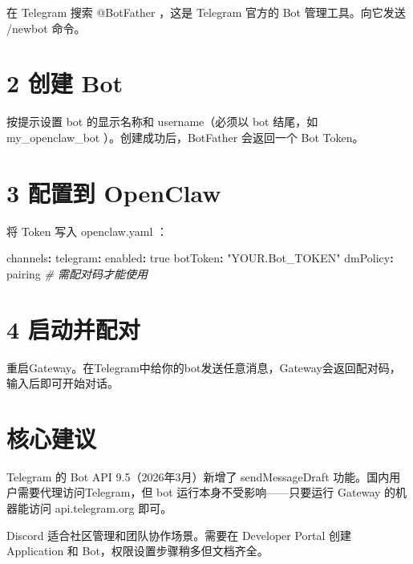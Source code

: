 \documentclass[
  10
]{article}
\newenvironment{Shaded}{}{}
\newcommand{\AttributeTok}[1]{\textcolor[rgb]{0.49,0.56,0.16}{#1}}
\newcommand{\CharTok}[1]{\textcolor[rgb]{0.25,0.44,0.63}{#1}}
\newcommand{\CommentTok}[1]{\textcolor[rgb]{0.38,0.63,0.69}{\textit{#1}}}
\newcommand{\FunctionTok}[1]{\textcolor[rgb]{0.02,0.16,0.49}{#1}}
\newcommand{\KeywordTok}[1]{\textcolor[rgb]{0.00,0.44,0.13}{\textbf{#1}}}
\newcommand{\StringTok}[1]{\textcolor[rgb]{0.25,0.44,0.63}{#1}}
\begin{document}
在 Telegram 搜索 @BotFather ，这是 Telegram 官方的 Bot
管理工具。向它发送 /newbot 命令。

\section{2 创建 Bot}\label{ux521bux5efa-bot}

按提示设置 bot 的显示名称和 username（必须以 bot 结尾，如
my\_openclaw\_bot ）。创建成功后，BotFather 会返回一个 Bot Token。

\section{3 配置到 OpenClaw}\label{ux914dux7f6eux5230-openclaw}

将 Token 写入 openclaw.yaml ：

\begin{Shaded}
\begin{Highlighting}[]
\FunctionTok{channels}\KeywordTok{:}\AttributeTok{  }
\AttributeTok{    }\FunctionTok{telegram}\KeywordTok{:}\AttributeTok{  }
\AttributeTok{        }\FunctionTok{enabled}\KeywordTok{:}\AttributeTok{ }\CharTok{true}\AttributeTok{  }
\AttributeTok{        }\FunctionTok{botToken}\KeywordTok{:}\AttributeTok{ }\StringTok{"YOUR.Bot\_TOKEN"}\AttributeTok{  }
\AttributeTok{        }\FunctionTok{dmPolicy}\KeywordTok{:}\AttributeTok{ pairing}\CommentTok{ \# 需配对码才能使用}
\end{Highlighting}
\end{Shaded}

\section{4 启动并配对}\label{ux542fux52a8ux5e76ux914dux5bf9}

重启Gateway。在Telegram中给你的bot发送任意消息，Gateway会返回配对码，输入后即可开始对话。

\section{核心建议}\label{ux6838ux5fc3ux5efaux8bae-6}

Telegram 的 Bot API 9.5（2026年3月）新增了 sendMessageDraft
功能。国内用户需要代理访问Telegram，但 bot
运行本身不受影响------只要运行 Gateway 的机器能访问 api.telegram.org
即可。

Discord 适合社区管理和团队协作场景。需要在 Developer Portal 创建
Application 和 Bot，权限设置步骤稍多但文档齐全。
\end{document}
